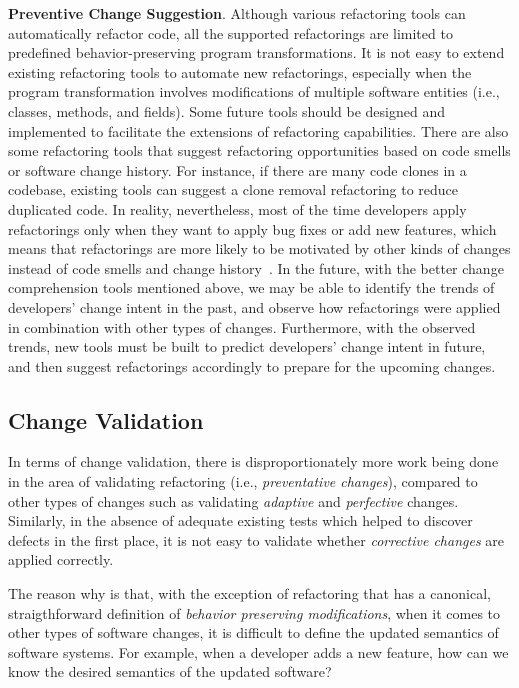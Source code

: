 \textbf{Preventive Change Suggestion}.
Although various refactoring tools can automatically refactor code, all the supported refactorings are limited to predefined behavior-preserving program transformations. It is not easy to extend existing refactoring tools to automate new refactorings, especially when the program transformation involves modifications of multiple software entities (i.e., classes, methods, and fields). Some future tools should be designed and implemented to facilitate the extensions of refactoring capabilities.
There are also some refactoring tools that suggest refactoring opportunities based on code smells or software change history. For instance, if there are many code clones in a codebase, existing tools can suggest a clone removal refactoring to reduce duplicated code. In reality, nevertheless, most of the time developers apply refactorings only when they want to apply bug fixes or add new features, which means that refactorings are more likely to be motivated by other kinds of changes instead of code smells and change history~\cite{Silva2016:WWR}. In the future, with the better change comprehension tools mentioned above, we may be able to identify the trends of developers' change intent in the past, and observe how refactorings were applied in combination with other types of changes. Furthermore, with the observed trends, new tools must be built to predict developers' change intent in future, and then suggest refactorings accordingly to prepare for the upcoming changes.


\subsection{Change Validation}
In terms of change validation, there is disproportionately more work being done in the area of validating refactoring (i.e., {\em preventative changes}), compared to other types of changes such as validating {\em adaptive} and {\em perfective} changes. Similarly, in the absence of adequate existing tests which helped to discover defects in the first place, it is not easy to validate whether {\em corrective changes} are applied correctly. 

The reason why is that, with the exception of refactoring that has a canonical, straigthforward definition of {\em behavior preserving modifications}, when it comes to other types of software changes, it is difficult to define the updated semantics of software systems. For example, when a developer adds a new feature, how can we know the desired semantics of the updated software?

